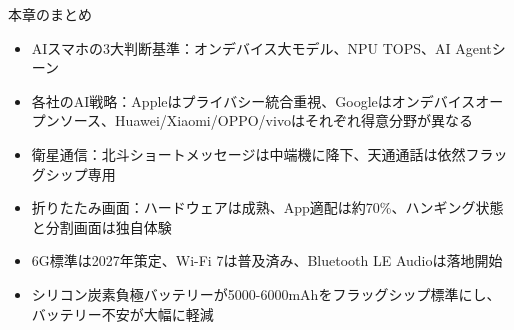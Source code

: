\begin{tcbsummary}{本章のまとめ}
\begin{itemize}
  \item AIスマホの3大判断基準：オンデバイス大モデル、NPU TOPS、AI Agentシーン
  \item 各社のAI戦略：Appleはプライバシー統合重視、Googleはオンデバイスオープンソース、Huawei/Xiaomi/OPPO/vivoはそれぞれ得意分野が異なる
  \item 衛星通信：北斗ショートメッセージは中端機に降下、天通通話は依然フラッグシップ専用
  \item 折りたたみ画面：ハードウェアは成熟、App適配は約70\%、ハンギング状態と分割画面は独自体験
  \item 6G標準は2027年策定、Wi-Fi 7は普及済み、Bluetooth LE Audioは落地開始
  \item シリコン炭素負極バッテリーが5000-6000mAhをフラッグシップ標準にし、バッテリー不安が大幅に軽減
\end{itemize}

\end{tcbsummary}
